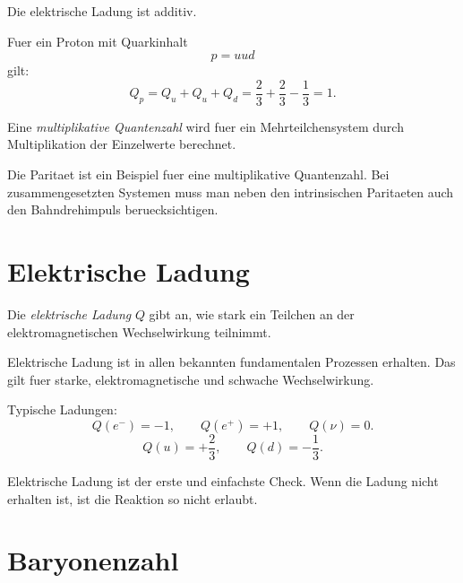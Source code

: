 \begin{examplebox}
Die elektrische Ladung ist additiv.

Fuer ein Proton mit Quarkinhalt
\[
    p=uud
\]
gilt:
\[
    Q_p
    =
    Q_u+Q_u+Q_d
    =
    \frac{2}{3}
    +
    \frac{2}{3}
    -
    \frac{1}{3}
    =
    1.
\]
\end{examplebox}

\begin{definitionbox}
Eine \emph{multiplikative Quantenzahl} wird fuer ein Mehrteilchensystem durch
Multiplikation der Einzelwerte berechnet.
\end{definitionbox}

\begin{conceptbox}
Die Paritaet ist ein Beispiel fuer eine multiplikative Quantenzahl.
Bei zusammengesetzten Systemen muss man neben den intrinsischen Paritaeten auch den
Bahndrehimpuls beruecksichtigen.
\end{conceptbox}

\section{Elektrische Ladung}

\begin{definitionbox}
Die \emph{elektrische Ladung} $Q$ gibt an, wie stark ein Teilchen an der
elektromagnetischen Wechselwirkung teilnimmt.
\end{definitionbox}

\begin{conceptbox}
Elektrische Ladung ist in allen bekannten fundamentalen Prozessen erhalten.
Das gilt fuer starke, elektromagnetische und schwache Wechselwirkung.
\end{conceptbox}

\begin{notebox}
Typische Ladungen:
\[
    Q(e^-)=-1,
    \qquad
    Q(e^+)=+1,
    \qquad
    Q(\nu)=0.
\]
\[
    Q(u)=+\frac{2}{3},
    \qquad
    Q(d)=-\frac{1}{3}.
\]
\end{notebox}

\begin{examtipbox}
Elektrische Ladung ist der erste und einfachste Check.
Wenn die Ladung nicht erhalten ist, ist die Reaktion so nicht erlaubt.
\end{examtipbox}

\section{Baryonenzahl}

